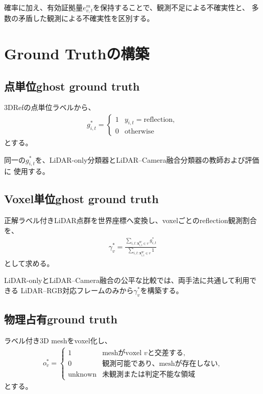 \documentclass[uplatex,a4paper,11pt]{jsarticle}
\begin{document}
確率に加え、有効証拠量$e_{v,t}^{m}$を保持することで、観測不足による不確実性と、
多数の矛盾した観測による不確実性を区別する。

\section{Ground Truthの構築}

\subsection{点単位ghost ground truth}

3DRefの点単位ラベルから、
\begin{align}
  g_{i,t}^{*}
  =
  \begin{cases}
    1
      & y_{i,t}
        =
        \mathrm{reflection},
    \\
    0
      & \text{otherwise}
  \end{cases}
\end{align}
とする。

同一の$g_{i,t}^{*}$を、LiDAR-only分類器とLiDAR--Camera融合分類器の教師および評価に
使用する。

\subsection{Voxel単位ghost ground truth}

正解ラベル付きLiDAR点群を世界座標へ変換し、voxelごとのreflection観測割合を、
\begin{align}
  \gamma_v^{*}
  =
  \frac{
    \sum_{i,t:
      \bm{x}_{i,t}^{W}\in v}
    g_{i,t}^{*}
  }{
    \sum_{i,t:
      \bm{x}_{i,t}^{W}\in v}
    1
  }
\end{align}
として求める。

LiDAR-onlyとLiDAR--Camera融合の公平な比較では、両手法に共通して利用できる
LiDAR--RGB対応フレームのみから$\gamma_v^{*}$を構築する。

\subsection{物理占有ground truth}

ラベル付き3D meshをvoxel化し、
\begin{align}
  o_v^{*}
  =
  \begin{cases}
    1
      & \text{meshがvoxel }v\text{と交差する},
    \\
    0
      & \text{観測可能であり、meshが存在しない},
    \\
    \mathrm{unknown}
      & \text{未観測または判定不能な領域}
  \end{cases}
\end{align}
とする。
\end{document}
